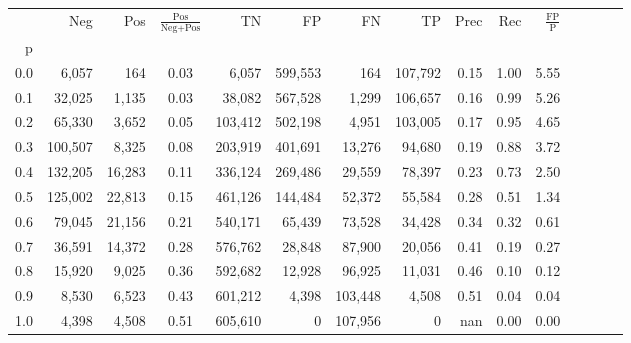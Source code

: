 \begin{tabular}{rrrcrrrrrrrrrrr}
\toprule
{} &      Neg &     Pos & $\frac{\text{Pos}}{\text{Neg}+\text{Pos}}$ &       TN &       FP &       FN &       TP &  Prec &   Rec & $\frac{\text{FP}}{\text{P}}$ \\
p   &          &         &                                            &          &          &          &          &       &       &                              \\
\midrule
0.0 &    6,057 &     164 &                                       0.03 &    6,057 &  599,553 &      164 &  107,792 &  0.15 &  1.00 &                         5.55 \\
0.1 &   32,025 &   1,135 &                                       0.03 &   38,082 &  567,528 &    1,299 &  106,657 &  0.16 &  0.99 &                         5.26 \\
0.2 &   65,330 &   3,652 &                                       0.05 &  103,412 &  502,198 &    4,951 &  103,005 &  0.17 &  0.95 &                         4.65 \\
0.3 &  100,507 &   8,325 &                                       0.08 &  203,919 &  401,691 &   13,276 &   94,680 &  0.19 &  0.88 &                         3.72 \\
0.4 &  132,205 &  16,283 &                                       0.11 &  336,124 &  269,486 &   29,559 &   78,397 &  0.23 &  0.73 &                         2.50 \\
0.5 &  125,002 &  22,813 &                                       0.15 &  461,126 &  144,484 &   52,372 &   55,584 &  0.28 &  0.51 &                         1.34 \\
0.6 &   79,045 &  21,156 &                                       0.21 &  540,171 &   65,439 &   73,528 &   34,428 &  0.34 &  0.32 &                         0.61 \\
0.7 &   36,591 &  14,372 &                                       0.28 &  576,762 &   28,848 &   87,900 &   20,056 &  0.41 &  0.19 &                         0.27 \\
0.8 &   15,920 &   9,025 &                                       0.36 &  592,682 &   12,928 &   96,925 &   11,031 &  0.46 &  0.10 &                         0.12 \\
0.9 &    8,530 &   6,523 &                                       0.43 &  601,212 &    4,398 &  103,448 &    4,508 &  0.51 &  0.04 &                         0.04 \\
1.0 &    4,398 &   4,508 &                                       0.51 &  605,610 &        0 &  107,956 &        0 &   nan &  0.00 &                         0.00 \\
\bottomrule
\end{tabular}
